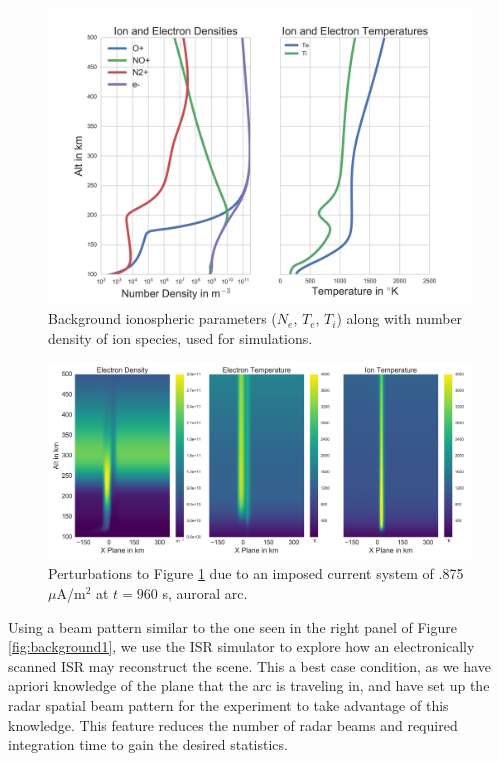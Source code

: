 \documentclass[draft,ras]{agutex}
\begin{document}
\begin{article}
\begin{figure}[!t]
\centering
\includegraphics[width=6in]{backgroundallparams}
\caption{Background ionospheric parameters ($N_e$, $T_e$, $T_i$) along with number density of ion species, used for simulations.}
\label{fig:plparamst0}
\end{figure}

\begin{figure}[!t]
\centering
\includegraphics[width=6in]{0960_15_int}
\caption{Perturbations to Figure \ref{fig:plparamst0} due to an imposed current system of .875 $\mu$A/m$^2$ at $t=960$ s, auroral arc.}
\label{fig:plparamst60}
\end{figure}

Using a beam pattern similar to the one seen in the right panel of Figure \ref{fig:background1}, we use the ISR simulator to explore how an electronically scanned ISR may reconstruct the scene. This a best case condition, as we have apriori knowledge of the plane that the arc is traveling in, and have set up the radar spatial beam pattern for the experiment to take advantage of this knowledge. This feature reduces the number of radar beams and required integration time to gain the desired statistics. 


\end{article}
\end{document}
